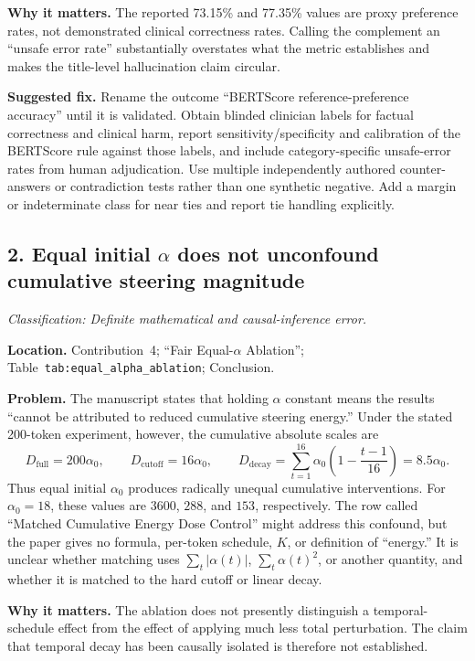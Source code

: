\documentclass[11pt]{article}
\newcommand{\findinglabel}[1]{\textbf{#1}}
\newcommand{\classification}[1]{\textit{Classification: #1.}}
\begin{document}
\findinglabel{Why it matters.} The reported 73.15\% and 77.35\% values are proxy preference rates, not demonstrated clinical correctness rates.  Calling the complement an ``unsafe error rate'' substantially overstates what the metric establishes and makes the title-level hallucination claim circular.

\findinglabel{Suggested fix.} Rename the outcome ``BERTScore reference-preference accuracy'' until it is validated.  Obtain blinded clinician labels for factual correctness and clinical harm, report sensitivity/specificity and calibration of the BERTScore rule against those labels, and include category-specific unsafe-error rates from human adjudication.  Use multiple independently authored counter-answers or contradiction tests rather than one synthetic negative.  Add a margin or indeterminate class for near ties and report tie handling explicitly.

\subsection*{2. Equal initial $\alpha$ does not unconfound cumulative steering magnitude}

\classification{Definite mathematical and causal-inference error}

\findinglabel{Location.} Contribution~4; ``Fair Equal-$\alpha$ Ablation''; Table~\texttt{tab:equal\_alpha\_ablation}; Conclusion.

\findinglabel{Problem.} The manuscript states that holding $\alpha$ constant means the results ``cannot be attributed to reduced cumulative steering energy.''  Under the stated 200-token experiment, however, the cumulative absolute scales are
\[
D_{\mathrm{full}}=200\alpha_0,\qquad
D_{\mathrm{cutoff}}=16\alpha_0,\qquad
D_{\mathrm{decay}}=
\sum_{t=1}^{16}\alpha_0\left(1-\frac{t-1}{16}\right)
=8.5\alpha_0.
\]
Thus equal initial $\alpha_0$ produces radically unequal cumulative interventions.  For $\alpha_0=18$, these values are $3600$, $288$, and $153$, respectively.  The row called ``Matched Cumulative Energy Dose Control'' might address this confound, but the paper gives no formula, per-token schedule, $K$, or definition of ``energy.''  It is unclear whether matching uses $\sum_t|\alpha(t)|$, $\sum_t\alpha(t)^2$, or another quantity, and whether it is matched to the hard cutoff or linear decay.

\findinglabel{Why it matters.} The ablation does not presently distinguish a temporal-schedule effect from the effect of applying much less total perturbation.  The claim that temporal decay has been causally isolated is therefore not established.
\end{document}
